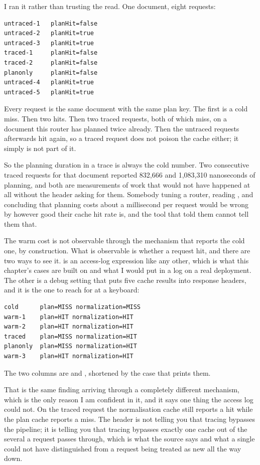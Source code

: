 I ran it rather than trusting the read. One document, eight requests:

\begin{verbatim}
untraced-1   planHit=false
untraced-2   planHit=true
untraced-3   planHit=true
traced-1     planHit=false
traced-2     planHit=false
planonly     planHit=false
untraced-4   planHit=true
untraced-5   planHit=true
\end{verbatim}

Every request is the same document with the same plan key. The first is a cold
miss. Then two hits. Then two traced requests, both of which miss, on a document
this router has planned twice already. Then the untraced requests afterwards hit
again, so a traced request does not poison the cache either; it simply is not
part of it.

%
So the planning duration in a trace is always the cold number. Two consecutive
traced requests for that document reported 832,666 and 1,083,310 nanoseconds of
planning, and both are measurements of work that would not have happened at all
without the header asking for them. Somebody tuning a router, reading
, and concluding that planning costs about a millisecond per
request would be wrong by however good their cache hit rate is, and the tool
that told them cannot tell them that.

The warm cost is not observable through the mechanism that reports the cold one,
by construction. What is observable is whether a request hit, and there are two
ways to see it.  is an access-log expression like any other,
which is what this chapter's cases are built on and what I would put in a log on
a real deployment. The other is a debug setting that puts five cache results
into response headers, and it is the one to reach for at a keyboard:

\begin{verbatim}
cold      plan=MISS normalization=MISS
warm-1    plan=HIT normalization=HIT
warm-2    plan=HIT normalization=HIT
traced    plan=MISS normalization=HIT
planonly  plan=MISS normalization=HIT
warm-3    plan=HIT normalization=HIT
\end{verbatim}

The two columns are  and
, shortened by the case that prints them.

%
That is the same finding arriving through a completely different mechanism,
which is the only reason I am confident in it, and it says one thing the access
log could not. On the traced request the normalisation cache still reports a
hit while the plan cache reports a miss. The header is not telling you that
tracing bypasses the pipeline; it is telling you that tracing bypasses exactly
one cache out of the several a request passes through, which is what the source
says and what a single  could not have distinguished from a
request being treated as new all the way down.

